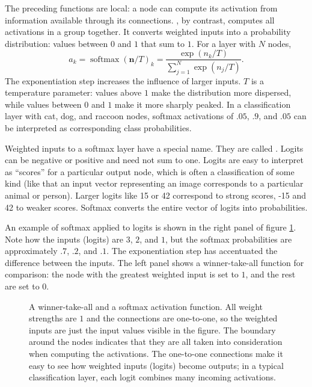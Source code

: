 The preceding functions are local: a node can compute its activation from information available through its connections. , by contrast, computes all activations in a group together. It converts weighted inputs into a probability distribution: values between $0$ and $1$ that sum to $1$. For a layer with $N$ nodes,
\[
 a_k=\operatorname{softmax}(\mathbf{n}/T)_k=\frac{\exp(n_k/T)}{\displaystyle\sum_{j=1}^{N}\exp(n_j/T)}.
\]
The exponentiation step increases the influence of larger inputs. $T$ is a temperature parameter: values above $1$ make the distribution more dispersed, while values between $0$ and $1$ make it more sharply peaked. In a classification layer with cat, dog, and raccoon nodes, softmax activations of $.05$, $.9$, and $.05$ can be interpreted as corresponding class probabilities.

Weighted inputs to a softmax layer have a special name. They are called . Logits can be negative or positive and need not sum to one. Logits are easy to interpret as ``scores'' for a particular output node, which is often a classification of some kind (like that an input vector representing an image corresponds to a particular animal or person). Larger logits like 15 or 42 correspond to strong scores, -15 and 42 to weaker scores.  Softmax converts the entire vector of logits into probabilities. 
 
An example of softmax applied to logits is shown in the right panel of figure \ref{abridged_softmax}. Note how the inputs (logits) are $3$, $2$, and $1$, but the softmax probabilities are approximately $.7$, $.2$, and $.1$. The exponentiation step has accentuated the difference between the inputs. The left panel shows a winner-take-all function for comparison: the node with the greatest weighted input is set to $1$, and the rest are set to $0$.

\begin{figure}[htbp]
\centering
{}
\caption[Jeff Yoshimi.]{A winner-take-all and a softmax activation function. All weight strengths are $1$ and the connections are one-to-one, so the weighted inputs are just the input values visible in the figure. The boundary around the nodes indicates that they are all taken into consideration when computing the activations. The one-to-one connections make it easy to see how weighted inputs (logits) become outputs; in a typical classification layer, each logit combines many incoming activations.}
\label{abridged_softmax}
\end{figure}

